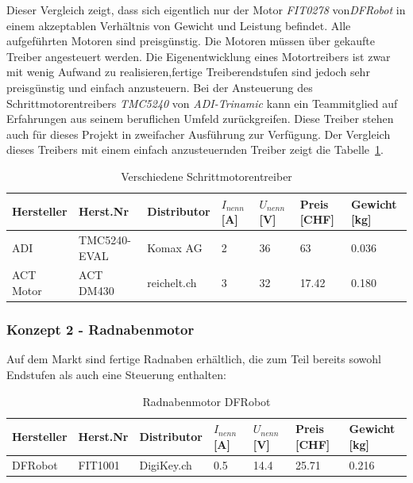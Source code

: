 \documentclass[main.  tex]{subfiles} %
\begin{document}
Dieser Vergleich zeigt, dass sich eigentlich nur der Motor \textit{FIT0278}
von\textit{DFRobot} in einem akzeptablen Verhältnis von Gewicht und Leistung
befindet. Alle aufgeführten Motoren sind preisgünstig. Die Motoren müssen über
gekaufte Treiber angesteuert werden. Die Eigenentwicklung eines Motortreibers
ist zwar mit wenig Aufwand zu realisieren,fertige Treiberendstufen sind jedoch
sehr preisgünstig und einfach anzusteuern. Bei der Ansteuerung des
Schrittmotorentreibers \textit{TMC5240} von \textit{ADI-Trinamic} kann ein
Teammitglied auf Erfahrungen aus seinem beruflichen Umfeld zurückgreifen. Diese
Treiber stehen auch für dieses Projekt in zweifacher Ausführung zur Verfügung.
Der Vergleich dieses Treibers mit einem einfach anzusteuernden Treiber zeigt
die Tabelle~\ref{tab:Schrittmotorentreiber_different}.

\begin{table}[h]
    \centering
    \begin{tabular}{|p{2cm}|p{3cm}|p{2cm}|p{1cm}|p{1cm}|p{1cm}|p{1.5cm}|}
        \hline
        Hersteller & Herst.Nr   & Distributor   & $I_{nenn} $ [A] & $U_{nenn}$ [V] & Preis [CHF] & Gewicht [kg] \\ \hline
        ADI        & TMC5240-EVAL & Komax AG      & 2               & 36             & 63          & 0.036      \\ \hline
        ACT Motor  & ACT DM430    & reichelt.ch & 3               & 32             & 17.42     & 0.180      \\ \hline
    \end{tabular}
    \caption{Verschiedene Schrittmotorentreiber}
    \label{tab:Schrittmotorentreiber_different}
\end{table}

\subsubsection*{Konzept 2 - Radnabenmotor} %

Auf dem Markt sind fertige Radnaben erhältlich, die zum Teil bereits sowohl
Endstufen als auch eine Steuerung enthalten:

\begin{table}[h]
    \centering
    \begin{tabular}{|p{2cm}|p{3cm}|p{2cm}|p{1cm}|p{1cm}|p{1cm}|p{1.5cm}|}
        \hline
        Hersteller & Herst.Nr & Distributor  & $I_{nenn} $ [A] & $U_{nenn}$ [V] & Preis [CHF] & Gewicht [kg] \\ \hline
        DFRobot    & FIT1001& DigiKey.ch & 0.5& 14.4& 25.71& 0.216\\ \hline
    \end{tabular}
    \caption{Radnabenmotor DFRobot}
\end{table}
\end{document}
